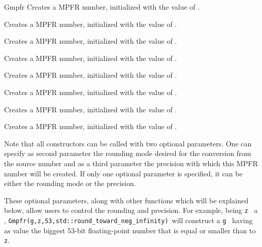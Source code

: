 \begin{ccRefClass} {Gmpfr}
        {Creates a MPFR number, initialized with the value of .}

        {Creates a MPFR number, initialized with the value of .}

        {Creates a MPFR number, initialized with the value of .}

        {Creates a MPFR number, initialized with the value of .}

        {Creates a MPFR number, initialized with the value of .}

        {Creates a MPFR number, initialized with the value of .}

        {Creates a MPFR number, initialized with the value of .}

        {Creates a MPFR number, initialized with the value of .}

Note that all constructors can be called with two optional parameters.
One can specify as second parameter the rounding mode desired for
the conversion from the source number and as a third parameter the
precision with which this MPFR number will be created.  If only one
optional parameter is specified, it can be either the rounding mode or
the precision.

These optional parameters, along with other functions which will be
explained below, allow users to control the rounding and precision.
For example, being \verb-z- \ a ,
\verb-Gmpfr(g,z,53,std::round_toward_neg_infinity)-\ will construct a
 \verb-g- \ having as value the biggest 53-bit
floating-point number that is equal or smaller than to \verb-z-.



\end{ccRefClass}
